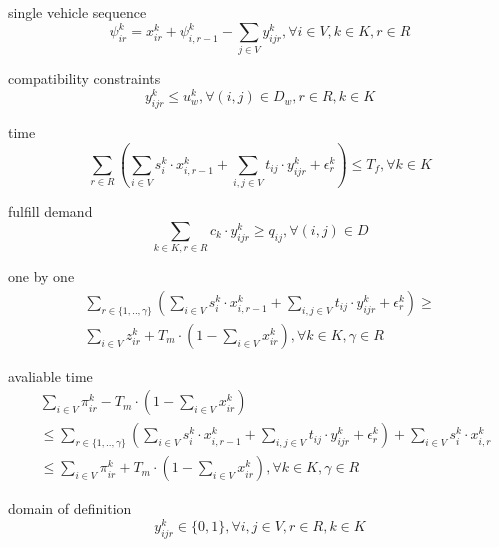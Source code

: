 \documentclass[preprint,12pt,authoryear]{elsarticle}
\begin{document}
single vehicle sequence
\begin{equation}
    \psi_{ir}^k=x_{ir}^k+\psi_{i,r-1}^k-\sum_{j\in V}{y_{ijr}^k},\forall i\in V,k\in K,r\in R
\label{svsy}
\end{equation}

compatibility constraints
\begin{equation}
    y_{ijr}^k\leq u_w^k, \forall (i,j)\in D_w, r\in R, k\in K
\label{ccy}
\end{equation}

time
\begin{equation}
    \sum_{r\in R}{(
        \sum_{i\in V}{s_i^k\cdot x_{i,r-1}^k}
        +\sum_{i,j\in V}{t_{ij}\cdot y_{ijr}^k}
        +\epsilon_r^k
    )}
    \leq T_f,
    \forall k\in K
\label{tmy}
\end{equation}

fulfill demand
\begin{equation}
    \sum_{k\in K,r\in R}{c_k\cdot y_{ijr}^k}\geq q_{ij}, \forall (i,j)\in D
\label{fdy}
\end{equation}

one by one
\begin{equation}
    \begin{split}
        \sum_{r\in \{1,..,\gamma\}}{(
            \sum_{i\in V}{s_i^k\cdot x_{i,r-1}^k}
            +\sum_{i,j\in V}{t_{ij}\cdot y_{ijr}^k}
            +\epsilon_r^k
        )} \geq \\
        \sum_{i\in V}{z_{ir}^k}+T_m\cdot(1-\sum_{i\in V}{x_{ir}^k}),
        \forall k\in K,\gamma \in R
    \end{split}
\label{1b1y}
\end{equation}

avaliable time
\begin{equation}
    \begin{split}
        &\sum_{i\in V}{\pi_{ir}^k}-T_m\cdot(1-\sum_{i\in V}{x_{ir}^k})\\
        &\leq \sum_{r\in \{1,..,\gamma\}}{(
            \sum_{i\in V}{s_i^k\cdot x_{i,r-1}^k}
            +\sum_{i,j\in V}{t_{ij}\cdot y_{ijr}^k}
            +\epsilon_r^k
        )}  + \sum_{i\in V}{s_i^k\cdot x_{i,r}^k}\\
        &\leq \sum_{i\in V}{\pi_{ir}^k}+T_m\cdot(1-\sum_{i\in V}{x_{ir}^k}),
        \forall k\in K,\gamma \in R
    \end{split}
\label{avltyz}
\end{equation}

domain of definition
\begin{equation}
    y_{ijr}^k\in \{0,1\}, \forall i,j\in V,r\in R,k\in K
\label{ddy}
\end{equation}
\end{document}
